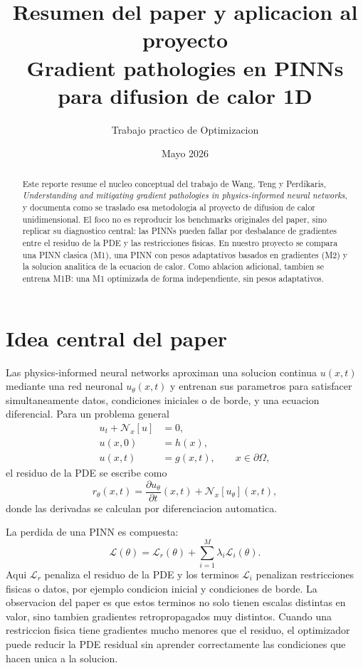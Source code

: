\documentclass[11pt,a4paper]{article}
\title{Resumen del paper y aplicacion al proyecto\\
\large Gradient pathologies en PINNs para difusion de calor 1D}
\author{Trabajo practico de Optimizacion}
\date{Mayo 2026}
\begin{document}
\maketitle

\begin{abstract}
Este reporte resume el nucleo conceptual del trabajo de Wang, Teng y
Perdikaris, \emph{Understanding and mitigating gradient pathologies in
physics-informed neural networks}, y documenta como se traslado esa metodologia
al proyecto de difusion de calor unidimensional. El foco no es reproducir los
benchmarks originales del paper, sino replicar su diagnostico central: las
PINNs pueden fallar por desbalance de gradientes entre el residuo de la PDE y
las restricciones fisicas. En nuestro proyecto se compara una PINN clasica
(M1), una PINN con pesos adaptativos basados en gradientes (M2) y la solucion
analitica de la ecuacion de calor. Como ablacion adicional, tambien se entrena
M1B: una M1 optimizada de forma independiente, sin pesos adaptativos.
\end{abstract}

\section{Idea central del paper}

Las physics-informed neural networks aproximan una solucion continua
$u(x,t)$ mediante una red neuronal $u_\theta(x,t)$ y entrenan sus parametros
para satisfacer simultaneamente datos, condiciones iniciales o de borde, y una
ecuacion diferencial. Para un problema general
\begin{align}
  u_t + \mathcal{N}_x[u] &= 0,\\
  u(x,0) &= h(x),\\
  u(x,t) &= g(x,t), \qquad x\in\partial\Omega,
\end{align}
el residuo de la PDE se escribe como
\begin{equation}
  r_\theta(x,t) =
  \frac{\partial u_\theta}{\partial t}(x,t) +
  \mathcal{N}_x[u_\theta](x,t),
\end{equation}
donde las derivadas se calculan por diferenciacion automatica.

La perdida de una PINN es compuesta:
\begin{equation}
  \mathcal{L}(\theta)
  = \mathcal{L}_r(\theta) + \sum_{i=1}^{M}\lambda_i\mathcal{L}_i(\theta).
\end{equation}
Aqui $\mathcal{L}_r$ penaliza el residuo de la PDE y los terminos
$\mathcal{L}_i$ penalizan restricciones fisicas o datos, por ejemplo condicion
inicial y condiciones de borde. La observacion del paper es que estos terminos
no solo tienen escalas distintas en valor, sino tambien gradientes
retropropagados muy distintos. Cuando una restriccion fisica tiene gradientes
mucho menores que el residuo, el optimizador puede reducir la PDE residual sin
aprender correctamente las condiciones que hacen unica a la solucion.
\end{document}
